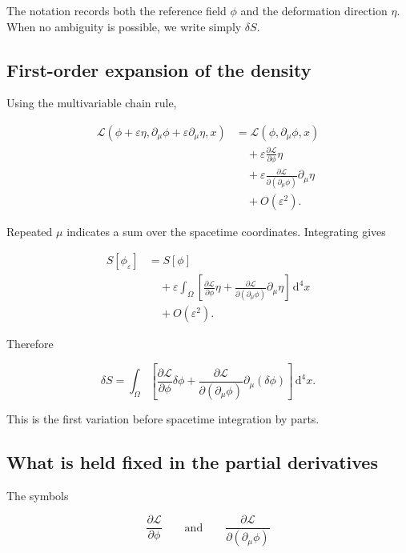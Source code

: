 The notation records both the reference field \(\phi\) and the deformation direction \(\eta\). When no ambiguity is possible, we write simply \(\delta S\).

\subsection{First-order expansion of the density}

Using the multivariable chain rule,

\[
\begin{aligned}
\mathcal{L}(
\phi+\varepsilon\eta,
\partial_{\mu}\phi+
\varepsilon\partial_{\mu}\eta,
x)
&=
\mathcal{L}(
\phi,
\partial_{\mu}\phi,
x)\\
&\quad+
\varepsilon
\frac{\partial\mathcal{L}}{\partial\phi}
\eta\\
&\quad+
\varepsilon
\frac{\partial\mathcal{L}}
{\partial(\partial_{\mu}\phi)}
\partial_{\mu}\eta\\
&\quad+
O(\varepsilon^{2}).
\end{aligned}
\]

Repeated \(\mu\) indicates a sum over the spacetime coordinates. Integrating gives

\[
\begin{aligned}
S[\phi_{\varepsilon}]
&=
S[\phi]\\
&\quad+
\varepsilon
\int_{\Omega}
\left[
\frac{\partial\mathcal{L}}{\partial\phi}
\eta
+
\frac{\partial\mathcal{L}}
{\partial(\partial_{\mu}\phi)}
\partial_{\mu}\eta
\right]
\,\mathrm{d}^{4}x\\
&\quad+
O(\varepsilon^{2}).
\end{aligned}
\]

Therefore

\[
\boxed{
\delta S
=
\int_{\Omega}
\left[
\frac{\partial\mathcal{L}}{\partial\phi}
\delta\phi
+
\frac{\partial\mathcal{L}}
{\partial(\partial_{\mu}\phi)}
\partial_{\mu}(\delta\phi)
\right]
\,\mathrm{d}^{4}x
}.
\]

This is the first variation before spacetime integration by parts.

\subsection{What is held fixed in the partial derivatives}

The symbols

\[
\frac{\partial\mathcal{L}}{\partial\phi}
\qquad\text{and}\qquad
\frac{\partial\mathcal{L}}
{\partial(\partial_{\mu}\phi)}
\]

